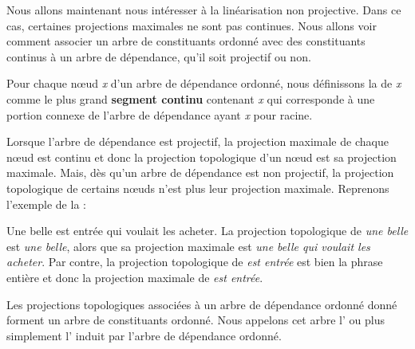 Nous allons maintenant nous intéresser à la linéarisation non projective. Dans ce cas, certaines projections maximales ne sont pas continues. Nous allons voir comment associer un arbre de constituants ordonné avec des constituants continus à un arbre de dépendance, qu’il soit projectif ou non.

{Pour chaque nœud \textit{x} d’un arbre de dépendance ordonné, nous définissons la  de \textit{x} comme le plus grand \textbf{segment continu} contenant \textit{x} qui corresponde à une portion connexe de l’arbre de dépendance ayant \textit{x} pour racine.}

Lorsque l’arbre de dépendance est projectif, la projection maximale de chaque nœud est continu et donc la projection topologique d’un nœud est sa projection maximale. Mais, dès qu’un arbre de dépendance est non projectif, la projection topologique de certains nœuds n’est plus leur projection maximale. Reprenons l’exemple de la  :

\ea
    {Une belle est entrée qui voulait les acheter}.
\z
La projection topologique de \textit{une belle} est \textit{une belle}, alors que sa projection maximale est \textit{une belle qui voulait les acheter}. Par contre, la projection topologique de \textit{est entrée} est bien la phrase entière et donc la projection maximale de \textit{est entrée}.

Les projections topologiques associées à un arbre de dépendance ordonné donné forment un arbre de constituants ordonné. Nous appelons cet arbre l’ ou plus simplement l’ induit par l’arbre de dépendance ordonné.

